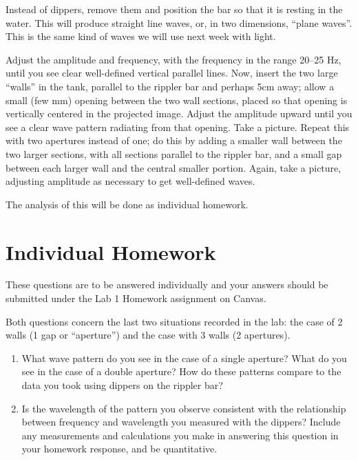 Instead of dippers, remove them and position the bar so that it is resting in the water. This will produce straight line waves, or, in two dimensions, ``plane waves''. This is the same kind of waves we will use next week with light.

Adjust the amplitude and frequency, with the frequency in the range 20--25 Hz, until you see
clear well-defined vertical parallel lines. Now, insert the two large ``walls'' in the tank, parallel to the rippler bar and
perhaps 5cm away; allow a small (few mm) opening between the two wall sections, placed so that opening is vertically
centered in the projected image. Adjust the amplitude upward until you see a clear wave pattern radiating from that
opening. Take a picture. Repeat this with two apertures instead of one; do this by adding a smaller wall between the
two larger sections, with all sections parallel to the rippler bar, and a small gap between each larger wall and the central
smaller portion. Again, take a picture, adjusting amplitude as necessary to get well-defined waves.

The analysis of this will be done as individual homework.

\section{Individual Homework}

These questions are to be answered individually and your answers should be submitted under the Lab 1 Homework assignment on Canvas.

Both questions concern the last two situations recorded in the lab: the case of 2 walls (1 gap or ``aperture'') and the case with 3 walls (2 apertures).

\begin{enumerate}
	\item What wave pattern do you see in the case of a single aperture? What do you see in the case of a double aperture?
	How do these patterns compare to the data you took using dippers on the rippler bar?
	
	\item Is the wavelength of the pattern you observe consistent with the relationship between frequency and wavelength you
	measured with the dippers? Include any measurements and calculations you make in answering this question in your homework response, and be quantitative.
\end{enumerate}